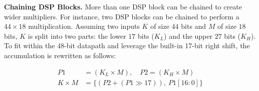 \documentclass[conference]{IEEEtran}
\begin{document}





\noindent\textbf{Chaining DSP Blocks.} \label{sec_dsp_cascade}
More than one DSP block can be chained to create wider multipliers.
For instance, two DSP blocks can be chained to perform a $44\times18$ multiplication.
Assuming two inputs $K$ of size $44$ bits and $M$ of size $18$ bits,
$K$ is split into two parts: the lower $17$ bits ($K_L$) and the upper $27$ bits ($K_H$).
To fit within the 48-bit datapath and leverage the built-in 17-bit right shift, the accumulation is rewritten as follows:

\begin{equation} \label{dsp_cascade_shift_eq}
\begin{split}
    P1 &= (K_L\times M), \quad P2 = (K_H \times M)\\
    K\times M &=  \{(P2 + (P1 \gg 17)),
            \ P1[16:0]\}
\end{split}
\end{equation}
\end{document}
